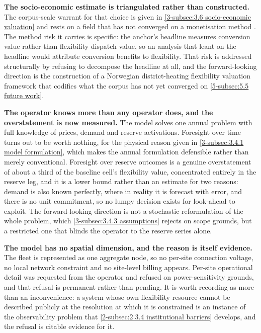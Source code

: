 \textbf{The socio-economic estimate is triangulated rather than constructed.} The corpus-scale warrant for that choice is given in \autoref{3-subsec:3.6 socio-economic valuation} and rests on a field that has not converged on a monetisation method \cite{ahmed_district_2025}. The method risk it carries is specific: the anchor's headline measures conversion value rather than flexibility dispatch value, so an analysis that leant on the headline would attribute conversion benefits to flexibility. That risk is addressed structurally by refusing to decompose the headline at all, and the forward-looking direction is the construction of a Norwegian district-heating flexibility valuation framework that codifies what the corpus has not yet converged on \autoref{5-subsec:5.5 future work}.

\textbf{The operator knows more than any operator does, and the overstatement is now measured.} The model solves one annual problem with full knowledge of prices, demand and reserve activations. Foresight over time turns out to be worth nothing, for the physical reason given in \autoref{3-subsec:3.4.1 model formulation}, which makes the annual formulation defensible rather than merely conventional. Foresight over reserve outcomes is a genuine overstatement of about a third of the baseline cell's flexibility value, concentrated entirely in the reserve leg, and it is a lower bound rather than an estimate for two reasons: demand is also known perfectly, where in reality it is forecast with error, and there is no unit commitment, so no lumpy decision exists for look-ahead to exploit. The forward-looking direction is not a stochastic reformulation of the whole problem, which \autoref{3-subsec:3.4.3 assumptions} rejects on scope grounds, but a restricted one that blinds the operator to the reserve series alone.

\textbf{The model has no spatial dimension, and the reason is itself evidence.} The fleet is represented as one aggregate node, so no per-site connection voltage, no local network constraint and no site-level billing appears. Per-site operational detail was requested from the operator and refused on power-sensitivity grounds, and that refusal is permanent rather than pending. It is worth recording as more than an inconvenience: a system whose own flexibility resource cannot be described publicly at the resolution at which it is constrained is an instance of the observability problem that \autoref{2-subsec:2.3.4 institutional barriers} develops, and the refusal is citable evidence for it.

